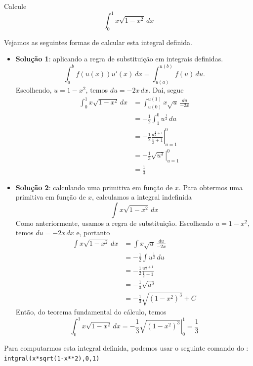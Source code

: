 \cleardoublepage\documentclass[../main.tex]{subfiles}
\begin{document}
\begin{exeresol}
  Calcule
  \begin{equation*}
    \int_0^1x\sqrt{1-x^2}\,dx
  \end{equation*}
  \begin{resol}
  Vejamos as seguintes formas de calcular esta integral definida.
  \begin{itemize}
  \item {\bf Solução 1}: aplicando a regra de substituição em integrais definidas.
    \begin{equation*}
      \int_a^bf(u(x))u'(x)\,dx = \int_{u(a)}^{u(b)} f(u)\,du.
    \end{equation*}
    Escolhendo, $u = 1-x^2$, temos $du = -2x\,dx$. Daí, segue
    \begin{align*}
      \int_0^1x\sqrt{1-x^2}\,dx &= \int_{u(0)}^{u(1)}x\sqrt{u}\,\frac{du}{-2x}\\
                                &= -\frac{1}{2}\int_{1}^0 u^{\frac{1}{2}}\,du\\
                                &= -\frac{1}{2}\left.\frac{u^{\frac{1}{2}+1}}{\frac{1}{2}+1}\right|_{u=1}^0\\
                                &= -\frac{1}{3}\left.\sqrt{u^3}\right|_{u=1}^0\\
                                &= \frac{1}{3}
    \end{align*}
  \item {\bf Solução 2}: calculando uma primitiva em função de $x$.
    Para obtermos uma primitiva em função de $x$, calculamos a integral indefinida
    \begin{equation*}
      \int x\sqrt{1-x^2}\,dx
    \end{equation*}
    Como anteriormente, usamos a regra de substituição. Escolhendo $u=1-x^2$, temos $du = -2x\,dx$ e, portanto
    \begin{align*}
      \int x\sqrt{1-x^2}\,dx &= \int x\sqrt{u}\,\frac{du}{-2x}\\
                             &= -\frac{1}{2}\int u^{\frac{1}{2}}\,du\\
                             &= -\frac{1}{2}\frac{u^{\frac{1}{2}+1}}{\frac{1}{2}+1}\\
                             &= -\frac{1}{3}\sqrt{u^3}\\
                             &= -\frac{1}{3}\sqrt{(1-x^2)^3} + C
    \end{align*}
    Então, do teorema fundamental do cálculo, temos
    \begin{equation*}
      \int_0^1 x\sqrt{1-x^2}\,dx = -\frac{1}{3}\left.\sqrt{(1-x^2)^3}\right|_{0}^1 = \frac{1}{3}
    \end{equation*}
  \end{itemize}

  
  Para computarmos esta integral definida, podemos usar o seguinte comando do \geogebra: \verb|intgral(x*sqrt(1-x**2),0,1)|
\end{resol}
\end{exeresol}
\end{document}
